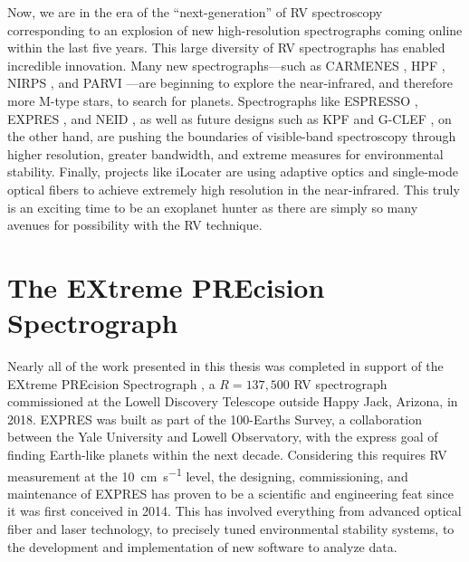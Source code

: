 Now, we are in the era of the ``next-generation'' of RV spectroscopy corresponding to an explosion of new high-resolution spectrographs coming online within the last five years. This large diversity of RV spectrographs has enabled incredible innovation. Many new spectrographs---such as CARMENES \citep{quirrenbach_carmenes_2016}, HPF \citep{mahadevan_habitable-zone_2014}, NIRPS \citep{wildi_nirps_2017}, and PARVI \citep{gibson_characterization_2020}---are beginning to explore the near-infrared, and therefore more M-type stars, to search for planets. Spectrographs like ESPRESSO \citep{pepe_espresso_2013}, EXPRES \citep{jurgenson_expres_2016}, and NEID \citep{schwab_design_2016}, as well as future designs such as KPF \citep{gibson_kpf_2016} and G-CLEF \citep{szentgyorgyi_gmt-consortium_2016}, on the other hand, are pushing the boundaries of visible-band spectroscopy through higher resolution, greater bandwidth, and extreme measures for environmental stability. Finally, projects like iLocater \citep{crepp_ilocater_2016} are using adaptive optics and single-mode optical fibers to achieve extremely high resolution in the near-infrared. This truly is an exciting time to be an exoplanet hunter as there are simply so many avenues for possibility with the RV technique.

\section{The EXtreme PREcision Spectrograph} \label{intro:expres}

Nearly all of the work presented in this thesis was completed in support of the EXtreme PREcision Spectrograph \citep[EXPRES;][]{jurgenson_expres_2016, blackman_performance_2020, petersburg_extreme-precision_2020}, a $R=137,500$ RV spectrograph commissioned at the Lowell Discovery Telescope outside Happy Jack, Arizona, in 2018. EXPRES was built as part of the 100-Earths Survey, a collaboration between the Yale University and Lowell Observatory, with the express goal of finding Earth-like planets within the next decade. Considering this requires RV measurement at the 10~\si{\centi\meter\per\second} level, the designing, commissioning, and maintenance of EXPRES has proven to be a scientific and engineering feat since it was first conceived in 2014. This has involved everything from advanced optical fiber and laser technology, to precisely tuned environmental stability systems, to the development and implementation of new software to analyze data.

